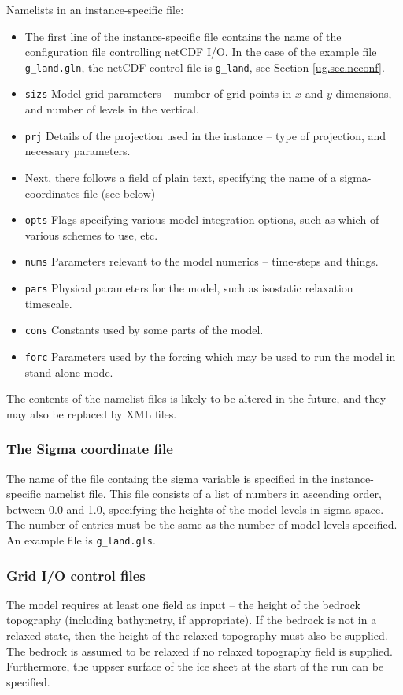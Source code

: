 Namelists in an instance-specific file:
%
\begin{itemize}
\item The first line of the instance-specific file contains the name of the configuration file controlling netCDF I/O. In the case of the example file
  \texttt{g\_land.gln}, the netCDF control file is \texttt{g\_land}, see Section \ref{ug.sec.ncconf}.
\item \texttt{sizs} Model grid parameters -- number of grid points in $x$ and
  $y$ dimensions, and number of levels in the vertical.
\item \texttt{prj} Details of the projection used in the instance -- type of
  projection, and necessary parameters.
\item Next, there follows a field of plain text, specifying the name of a
  sigma-coordinates file (see below)
\item \texttt{opts} Flags specifying various model integration options, such
  as which of various schemes to use, etc.
\item \texttt{nums} Parameters relevant to the model numerics -- time-steps and
  things.
\item \texttt{pars} Physical parameters for the model, such as isostatic
  relaxation timescale.
\item \texttt{cons} Constants used by some parts of the model.
\item \texttt{forc} Parameters used by the forcing which may be used to run
  the model in stand-alone mode.
\end{itemize}
%
The contents of the namelist files is likely to be altered in the future, and
they may also be replaced by XML files.
%
\subsubsection{The Sigma coordinate file}
%
The name of the file containg the sigma variable is specified in
the instance-specific namelist file. This file consists of a
list of numbers in ascending order, between 0.0 and 1.0, specifying the
heights of the model levels in sigma space. The number of entries must be the
same as the number of model levels specified. An example file is
\texttt{g\_land.gls}.

\subsubsection{Grid I/O control files}
The model requires at least one field as input -- the height of the bedrock
topography (including bathymetry, if appropriate). If the bedrock is not in a relaxed state, then
the height of the relaxed topography must also be supplied. The bedrock is assumed to be relaxed 
if no relaxed topography field is supplied. Furthermore, the uppser surface of the ice sheet at the 
start of the run can be specified.

